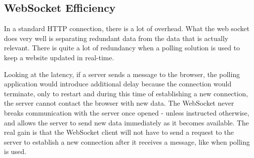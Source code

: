 \subsection{WebSocket Efficiency}

In a standard HTTP connection, there is a lot of overhead. 
What the web socket does very well is separating redundant data from the data 
that is actually relevant. There is quite a lot of redundancy when a polling solution is 
used to keep a website updated in real-time. 

Looking at the latency, if a server sends a message to the 
browser, the polling application would introduce additional delay because the 
connection would terminate, only to restart and
during this time of establishing a new connection, the server cannot 
contact the browser with new data. The WebSocket never 
breaks communication with the server once opened - unless instructed otherwise, 
and allows the server to send new data immediately as it becomes available. The real gain is that 
the WebSocket client will not have to send a request to the server to establish a new 
connection after it receives a message, like when polling is 
used.\cite{lubbersgreco}